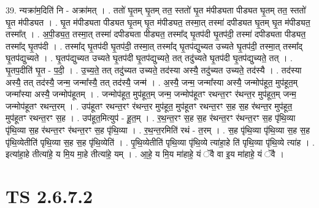 \documentclass[17pt]{extarticle}
\begin{document}
39. न्यक्रा॑म॒दिति॑ नि - अक्रा॑मत् । . ततो॑ घृ॒तम् घृ॒तम् तत॒ स्ततो॑ घृ॒त म॑पीड्यता पीड्यत घृ॒तम् तत॒ स्ततो॑ घृ॒त म॑पीड्यत । . घृ॒त म॑पीड्यता पीड्यत घृ॒तम् घृ॒त म॑पीड्यत॒ तस्मा॒त् तस्मा॑ दपीड्यत घृ॒तम् घृ॒त म॑पीड्यत॒ तस्मा᳚त् । . अ॒पी॒ड्य॒त॒ तस्मा॒त् तस्मा॑ दपीड्यता पीड्यत॒ तस्मा᳚द् घृ॒तप॑दी घृ॒तप॑दी॒ तस्मा॑ दपीड्यता पीड्यत॒ तस्मा᳚द् घृ॒तप॑दी । . तस्मा᳚द् घृ॒तप॑दी घृ॒तप॑दी॒ तस्मा॒त् तस्मा᳚द् घृ॒तप॑द्युच्यत उच्यते घृ॒तप॑दी॒ तस्मा॒त् तस्मा᳚द् घृ॒तप॑द्युच्यते । . घृ॒तप॑द्युच्यत उच्यते घृ॒तप॑दी घृ॒तप॑द्युच्यते॒ तत् तदु॑च्यते घृ॒तप॑दी घृ॒तप॑द्युच्यते॒ तत् । . घृ॒तप॒दीति॑ घृ॒त - प॒दी॒ । . उ॒च्य॒ते॒ तत् तदु॑च्यत उच्यते॒ तद॑स्या अस्यै॒ तदु॑च्यत उच्यते॒ तद॑स्यै । . तद॑स्या अस्यै॒ तत् तद॑स्यै॒ जन्म॒ जन्मा᳚स्यै॒ तत् तद॑स्यै॒ जन्म॑ । . अ॒स्यै॒ जन्म॒ जन्मा᳚स्या अस्यै॒ जन्मोप॑हूत॒ मुप॑हूत॒म् जन्मा᳚स्या अस्यै॒ जन्मोप॑हूतम् । . जन्मोप॑हूत॒ मुप॑हूत॒म् जन्म॒ जन्मोप॑हूतꣳ रथन्त॒रꣳ र॑थन्त॒र मुप॑हूत॒म् जन्म॒ जन्मोप॑हूतꣳ रथन्त॒रम् । . उप॑हूतꣳ रथन्त॒रꣳ र॑थन्त॒र मुप॑हूत॒ मुप॑हूतꣳ रथन्त॒रꣳ स॒ह स॒ह र॑थन्त॒र मुप॑हूत॒ मुप॑हूतꣳ रथन्त॒रꣳ स॒ह । . उप॑हूत॒मित्युप॑ - हू॒त॒म् । . र॒थ॒न्त॒रꣳ स॒ह स॒ह र॑थन्त॒रꣳ र॑थन्त॒रꣳ स॒ह पृ॑थि॒व्या पृ॑थि॒व्या स॒ह र॑थन्त॒रꣳ र॑थन्त॒रꣳ स॒ह पृ॑थि॒व्या । . र॒थ॒न्त॒रमिति॑ रथं - त॒रम् । . स॒ह पृ॑थि॒व्या पृ॑थि॒व्या स॒ह स॒ह पृ॑थि॒व्येतीति॑ पृथि॒व्या स॒ह स॒ह पृ॑थि॒व्येति॑ । . पृ॒थि॒व्येतीति॑ पृथि॒व्या पृ॑थि॒व्ये त्या॑हा॒हे ति॑ पृथि॒व्या पृ॑थि॒व्ये त्या॑ह । . इत्या॑हा॒हे तीत्या॑हे॒ य मि॒य मा॒हे तीत्या॑हे॒ यम् । . आ॒हे॒ य मि॒य मा॑हाहे॒ यं ॅवै वा इ॒य मा॑हाहे॒ यं ॅवै । \newline
\pagebreak
{}
\section*{ TS 2.6.7.2 }
\end{document}
